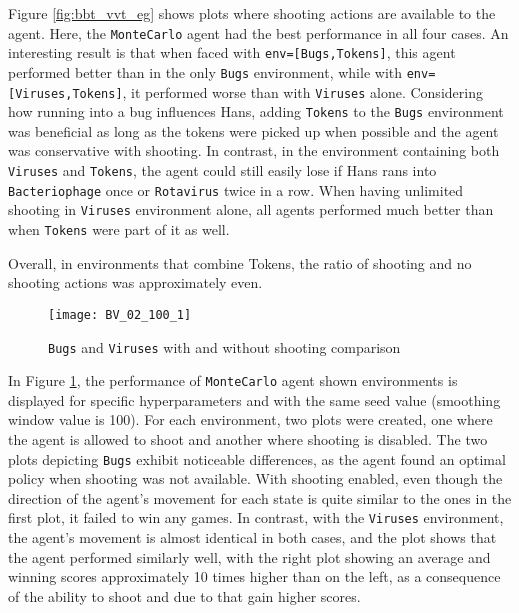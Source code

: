 Figure \ref{fig:bbt_vvt_eg} shows plots where shooting actions are available to the agent. Here, the \texttt{MonteCarlo} agent had the best performance in all four cases. An interesting result is that when faced with \texttt{env=[Bugs,Tokens]}, this agent performed better than in the only \texttt{Bugs} environment, while with \texttt{env=[Viruses,Tokens]}, it performed worse than with \texttt{Viruses} alone. Considering how running into a bug influences Hans, adding \texttt{Tokens} to the \texttt{Bugs} environment was beneficial as long as the tokens were picked up when possible and the agent was conservative with shooting. In contrast, in the environment containing both \texttt{Viruses} and \texttt{Tokens}, the agent could still easily lose if Hans rans into \texttt{Bacteriophage} once or \texttt{Rotavirus} twice in a row. When having unlimited shooting in \texttt{Viruses} environment alone, all agents performed much better than when \texttt{Tokens} were part of it as well.

Overall, in environments that combine Tokens, the ratio of shooting and no shooting actions was approximately even. 

\begin{figure}[h]
    \centering
    \texttt{[image: BV\_02\_100\_1]}
    \caption{\texttt{Bugs} and \texttt{Viruses} with and without shooting comparison}
    \label{fig:BV_02_100_1_eg}
\end{figure}


In Figure \ref{fig:BV_02_100_1_eg}, the performance of \texttt{MonteCarlo} agent shown environments is displayed for specific hyperparameters and with the same seed value (smoothing window value is 100). For each environment, two plots were created, one where the agent is allowed to shoot and another where shooting is disabled. The two plots depicting \texttt{Bugs} exhibit noticeable differences, as the agent found an optimal policy when shooting was not available. With shooting enabled, even though the direction of the agent's movement for each state is quite similar to the ones in the first plot, it failed to win any games. In contrast, with the \texttt{Viruses} environment, the agent's movement is almost identical in both cases, and the plot shows that the agent performed similarly well, with the right plot showing an average and winning scores approximately 10 times higher than on the left, as a consequence of the ability to shoot and due to that gain higher scores.
